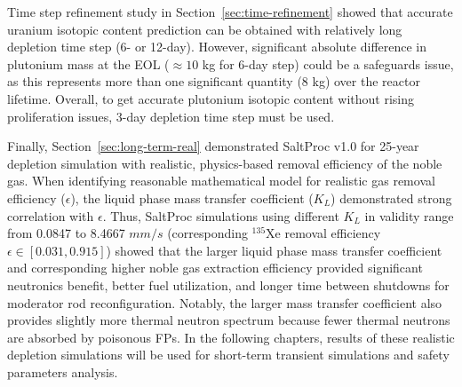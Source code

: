 Time step refinement study in Section~\ref{sec:time-refinement} showed that 
accurate uranium isotopic content prediction can be obtained with relatively 
long depletion time step (6- or 12-day). However, significant absolute 
difference in plutonium mass at the \gls{EOL} ($\approx10$ kg for 6-day step) 
could be a safeguards
issue, as this represents more than one significant 
quantity (8 kg) over the reactor lifetime. Overall, to get accurate plutonium 
isotopic content without rising proliferation issues, 3-day depletion time 
step must be used.

Finally, Section~\ref{sec:long-term-real} demonstrated SaltProc v1.0 for 
25-year depletion simulation with realistic, physics-based removal efficiency 
of the noble gas. When identifying reasonable mathematical model for realistic 
gas removal efficiency ($\epsilon$), the liquid phase mass transfer 
coefficient ($K_L$) demonstrated strong correlation with $\epsilon$. Thus, 
SaltProc simulations using different $K_L$ in validity range from 0.0847 to 
8.4667 $mm/s$ (corresponding $^{135}$Xe removal efficiency $\epsilon\in 
[0.031,0.915]$) showed that the larger liquid phase mass transfer coefficient 
and corresponding higher noble gas extraction efficiency provided significant 
neutronics benefit, better fuel utilization, and longer time between shutdowns 
for moderator rod reconfiguration. Notably, the larger mass transfer 
coefficient also provides slightly more thermal neutron spectrum because fewer 
thermal neutrons are absorbed by poisonous \glspl{FP}. In the following 
chapters, results of these realistic depletion simulations will be used for 
short-term transient simulations and safety parameters analysis. 
